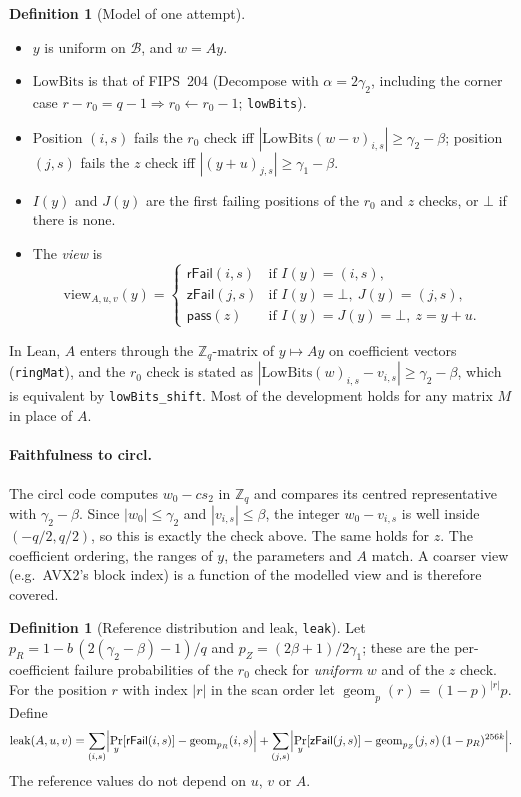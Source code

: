 \documentclass[11pt]{article}
\theoremstyle{definition}
\newtheorem{definition}[theorem]{Definition}
\theoremstyle{remark}
\newcommand{\Zq}{\mathbb{Z}_q}
\newcommand{\leak}{\operatorname{leak}}
\newcommand{\geom}{\operatorname{geom}}
\newcommand{\lean}[1]{\texttt{#1}}
\renewcommand{\Pr}{\mathop{\mathrm{Pr}}}
\begin{document}
\begin{definition}[Model of one attempt]\label{def:model}
\leavevmode
\begin{itemize}
  \item $y$ is uniform on $\mathcal{B}$, and $w = Ay$.
  \item $\mathrm{LowBits}$ is that of FIPS~204 (Decompose with $\alpha = 2\gamma_2$, including the
        corner case $r - r_0 = q-1 \Rightarrow r_0 \gets r_0 - 1$; \lean{lowBits}).
  \item Position $(i,s)$ fails the $r_0$ check iff $|\mathrm{LowBits}(w - v)_{i,s}| \ge
        \gamma_2-\beta$; position $(j,s)$ fails the $z$ check iff $|(y+u)_{j,s}| \ge \gamma_1-\beta$.
  \item $I(y)$ and $J(y)$ are the first failing positions of the $r_0$ and $z$ checks, or
        $\bot$ if there is none.
  \item The \emph{view} is
  \[
    \mathrm{view}_{A,u,v}(y) =
    \begin{cases}
      \mathsf{rFail}(i,s) & \text{if } I(y) = (i,s),\\
      \mathsf{zFail}(j,s) & \text{if } I(y) = \bot,\ J(y)=(j,s),\\
      \mathsf{pass}(z) & \text{if } I(y)=J(y)=\bot,\ z = y+u.
    \end{cases}
  \]
\end{itemize}
\end{definition}

In Lean, $A$ enters through the $\Zq$-matrix of $y\mapsto Ay$ on coefficient vectors
(\lean{ringMat}), and the $r_0$ check is stated as $|\mathrm{LowBits}(w)_{i,s} - v_{i,s}| \ge
\gamma_2-\beta$, which is equivalent by \lean{lowBits\_shift}. Most of the development holds for
any matrix $M$ in place of $A$.

\paragraph{Faithfulness to circl.}
The circl code computes $w_0 - cs_2$ in $\Zq$ and compares its centred representative with
$\gamma_2-\beta$. Since $|w_0|\le\gamma_2$ and $|v_{i,s}|\le\beta$, the integer $w_0-v_{i,s}$ is
well inside $(-q/2,q/2)$, so this is exactly the check above. The same holds for $z$. The
coefficient ordering, the ranges of $y$, the parameters and $A$ match. A coarser view (e.g.\
AVX2's block index) is a function of the modelled view and is therefore covered.

\begin{definition}[Reference distribution and leak, \lean{leak}]
Let $p_R = 1 - b\,(2(\gamma_2-\beta)-1)/q$ and $p_Z = (2\beta+1)/2\gamma_1$; these are the
per-coefficient failure probabilities of the $r_0$ check for \emph{uniform} $w$ and of the
$z$ check. For the position $r$ with index $|r|$ in the scan order let
$\geom_p(r) = (1-p)^{|r|} p$. Define
\[
  \leak(A,u,v) = \sum_{(i,s)} \Bigl|\Pr_y[\mathsf{rFail}(i,s)] - \geom_{p_R}(i,s)\Bigr|
  + \sum_{(j,s)} \Bigl|\Pr_y[\mathsf{zFail}(j,s)] - \geom_{p_Z}(j,s)\,(1-p_R)^{256k}\Bigr|.
\]
The reference values do not depend on $u$, $v$ or $A$.
\end{definition}
\end{document}
